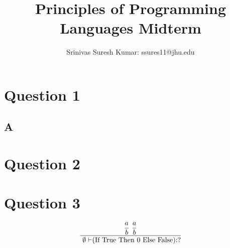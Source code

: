 \documentclass[a4paper]{article}
\title{Principles of Programming Languages Midterm}
\author{Srinivas Suresh Kumar: ssures11@jhu.edu}
\newcommand{\lotspace}{\text{        }}
\begin{document}
\maketitle
\setlength\parindent{30pt}

\section{Question 1}
    \subsection{A}
\section{Question 2}
\section{Question 3}
    \begin{equation*}
    \dfrac{\dfrac{a}{b} \lotspace \dfrac{a}{b}}{\text{ $ \emptyset \vdash $(If True Then 0 Else False):?}}
    \end{equation*}
\end{document}
